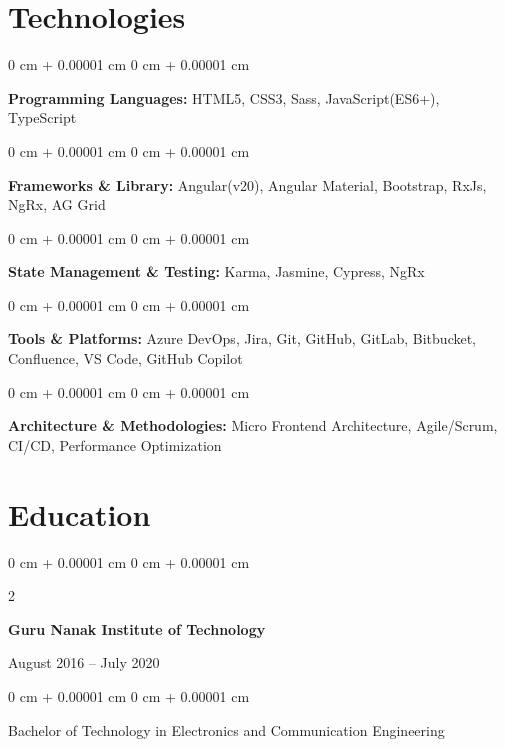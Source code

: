\documentclass[10pt, letterpaper]{article}
\newenvironment{highlights}{
    \begin{itemize}[
        topsep=0.10 cm,
        parsep=0.10 cm,
        partopsep=0pt,
        itemsep=0pt,
        leftmargin=0 cm + 10pt
    ]
}{
    \end{itemize}
} %
\newenvironment{onecolentry}{
    \begin{adjustwidth}{
        0 cm + 0.00001 cm
    }{
        0 cm + 0.00001 cm
    }
}{
    \end{adjustwidth}
} %
\newenvironment{twocolentry}[2][]{
    \onecolentry
    \def\secondColumn{#2}
    \setcolumnwidth{\fill, 4.5 cm}
    \begin{paracol}{2}
}{
    \switchcolumn \raggedleft \secondColumn
    \end{paracol}
    \endonecolentry
} %
\begin{document}
    
    \section{Technologies}
        \begin{onecolentry}
            \textbf{Programming Languages:} HTML5, CSS3, Sass, JavaScript(ES6+), TypeScript
        \end{onecolentry}


        \begin{onecolentry}
            \textbf{Frameworks \& Library:} Angular(v20), Angular Material, Bootstrap, RxJs, NgRx, AG Grid
        \end{onecolentry}


        \begin{onecolentry}
            \textbf{State Management \& Testing:} Karma, Jasmine, Cypress, NgRx
        \end{onecolentry}


        \begin{onecolentry}
            \textbf{Tools \& Platforms:} Azure DevOps, Jira, Git, GitHub, GitLab, Bitbucket, Confluence, VS Code, GitHub Copilot
        \end{onecolentry}


        \begin{onecolentry}
            \textbf{Architecture \& Methodologies:} Micro Frontend Architecture, Agile/Scrum, CI/CD, Performance Optimization
        \end{onecolentry}
        

    \section{Education}
        \begin{twocolentry}{August 2016 – July 2020}
            \textbf{Guru Nanak Institute of Technology} 
        \end{twocolentry}
        \vspace{0.10 cm}
        \begin{onecolentry}
            {Bachelor of Technology in Electronics and Communication Engineering}
        \end{onecolentry}
\end{document}
